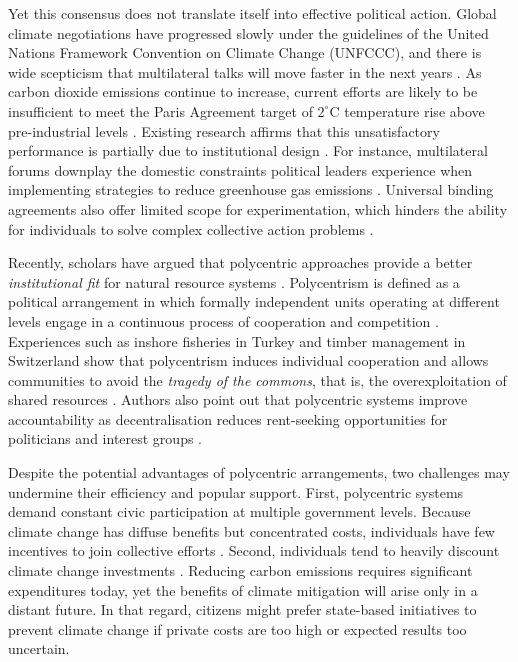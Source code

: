 \documentclass[a4paper,12pt]{article}
\begin{document}
Yet this consensus does not translate itself into effective political action. Global climate negotiations have progressed slowly under the guidelines of the United Nations Framework Convention on Climate Change (UNFCCC), and there is wide scepticism that multilateral talks will move faster in the next years \citep{cole2015advantages, hjerpe2015views}. As carbon dioxide emissions continue to increase, current efforts are likely to be insufficient to meet the Paris Agreement target of $2^{\circ}$C temperature rise above pre-industrial levels \citep{jordan2015emergence}. Existing research affirms that this unsatisfactory performance is partially due to institutional design \citep{ostrom2014polycentric, cole2015advantages}. For instance, multilateral forums downplay the domestic constraints political leaders experience when implementing strategies to reduce greenhouse gas emissions \citep{rayner2010eat}. Universal binding agreements also offer limited scope for experimentation, which hinders the ability for individuals to solve complex collective action problems \citep{de2014global}.

Recently, scholars have argued that polycentric approaches provide a better \textit{institutional fit} for natural resource systems \citep{turnheim2018innovating, berkhout2003negotiating, carlisle2017polycentric, ostrom1990governing}. Polycentrism is defined as a political arrangement in which formally independent units operating at different levels engage in a continuous process of cooperation and competition \citep{cole2015advantages, aligica2013co}. Experiences such as inshore fisheries in Turkey and timber management in Switzerland show that polycentrism induces individual cooperation and allows communities to avoid the \textit{tragedy of the commons}, that is, the overexploitation of shared resources \citep{hardin1968tragedy, ostrom1990governing}. Authors also point out that polycentric systems improve accountability as decentralisation reduces rent-seeking opportunities for politicians and interest groups \citep{turnheim2018innovating, ostrom2012nested, ostrom2014polycentric, sovacool2013adaptation}. 

Despite the potential advantages of polycentric arrangements, two challenges may undermine their efficiency and popular support. First, polycentric systems demand constant civic participation at multiple government levels. Because climate change has diffuse benefits but concentrated costs, individuals have few incentives to join collective efforts \citep{barrett2003increasing, heitzig2011self, nordhaus2015climate}. Second, individuals tend to heavily discount climate change investments \citep{dasgupta2008discounting, nordhaus1997discounting}. Reducing carbon emissions requires significant expenditures today, yet the benefits of climate mitigation will arise only in a distant future. In that regard, citizens might prefer state-based initiatives to prevent climate change if private costs are too high or expected results too uncertain. 
\end{document}
